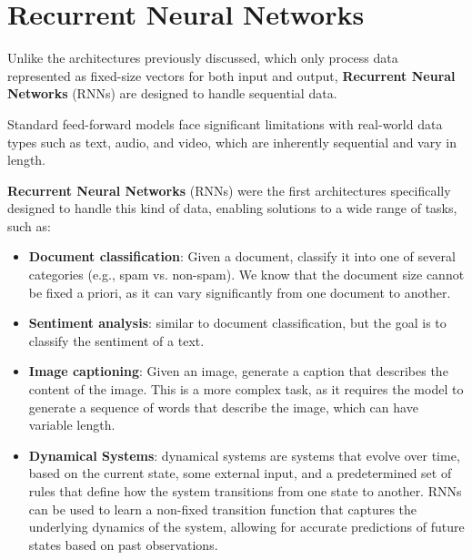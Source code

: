 \section{Recurrent Neural Networks}
Unlike the architectures previously discussed, which only process data represented as fixed-size vectors for both input and output,
\textbf{Recurrent Neural Networks} (RNNs) are designed to handle sequential data.

Standard feed-forward models face significant limitations with real-world data types such as text, audio, and video, which are inherently sequential and vary in length.

\textbf{Recurrent Neural Networks} (RNNs) were the first architectures specifically designed to handle
this kind of data, enabling solutions to a wide range of tasks, such as:
\begin{itemize}
    \item \textbf{Document classification}: Given a document, classify it into one of several categories (e.g., spam vs. non-spam).
    We know that the document size cannot be fixed a priori, as it can vary significantly from one document to another.
    \item \textbf{Sentiment analysis}: similar to document classification, but the goal is to classify the sentiment of a text.
    \item \textbf{Image captioning}: Given an image, generate a caption that describes the content of the image.
    This is a more complex task, as it requires the model to generate a sequence of words that describe the image, which can have variable length.
    \item \textbf{Dynamical Systems}: dynamical systems are systems that evolve over time, based on the current state, some external input,
    and a predetermined set of rules that define how the system transitions from one state to another.
    RNNs can be used to learn a non-fixed transition function that captures the underlying dynamics of the system, allowing for accurate predictions of future states based on past observations.
\end{itemize}

